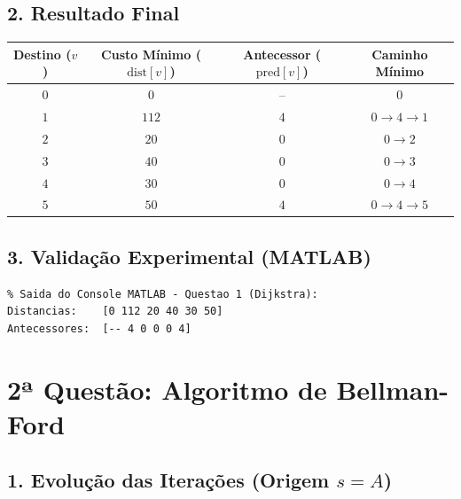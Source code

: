 \documentclass[11pt, a4paper]{article}
\begin{document}
\subsection*{2. Resultado Final}

\begin{center}
\begin{tabular}{cccc}
\toprule
\textbf{Destino ($v$)} & \textbf{Custo Mínimo ($\text{dist}[v]$)} & \textbf{Antecessor ($\text{pred}[v]$)} & \textbf{Caminho Mínimo} \\
\midrule
$0$ & $0$ & -- & $0$ \\
$1$ & $112$ & $4$ & $0 \to 4 \to 1$ \\
$2$ & $20$ & $0$ & $0 \to 2$ \\
$3$ & $40$ & $0$ & $0 \to 3$ \\
$4$ & $30$ & $0$ & $0 \to 4$ \\
$5$ & $50$ & $4$ & $0 \to 4 \to 5$ \\
\bottomrule
\end{tabular}
\end{center}

\subsection*{3. Validação Experimental (MATLAB)}
\begin{lstlisting}
% Saida do Console MATLAB - Questao 1 (Dijkstra):
Distancias:    [0 112 20 40 30 50]
Antecessores:  [-- 4 0 0 0 4]
\end{lstlisting}

\vspace{0.2cm}

\section*{2ª Questão: Algoritmo de Bellman-Ford}

\subsection*{1. Evolução das Iterações (Origem $s = A$)}
\end{document}
